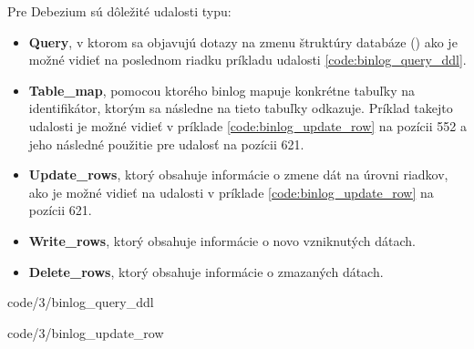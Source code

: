 Pre Debezium sú dôležité udalosti typu:
\begin{itemize}
\item \textbf{Query}, v ktorom sa objavujú dotazy na zmenu štruktúry databáze () ako je možné vidieť na poslednom riadku príkladu udalosti \ref{code:binlog_query_ddl}.
\item \textbf{Table\_map}, pomocou ktorého binlog mapuje konkrétne tabuľky na identifikátor, ktorým sa následne na tieto tabuľky odkazuje. Príklad takejto udalosti je možné vidieť v príklade \ref{code:binlog_update_row} na pozícii 552 a jeho následné použitie pre udalosť na pozícii 621. 
\item \textbf{Update\_rows}, ktorý obsahuje informácie o zmene dát na úrovni riadkov, ako je možné vidieť na udalosti v príklade \ref{code:binlog_update_row} na pozícii 621.
\item \textbf{Write\_rows}, ktorý obsahuje informácie o novo vzniknutých dátach.
\item \textbf{Delete\_rows}, ktorý obsahuje informácie o zmazaných dátach.
\end{itemize}


            {code/3/binlog_query_ddl}


            {code/3/binlog_update_row}
            
